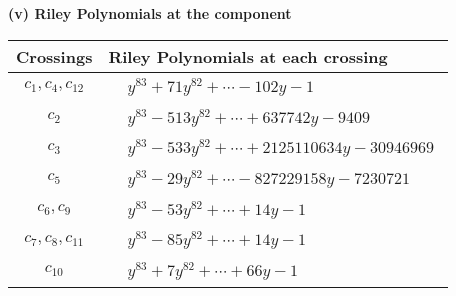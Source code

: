 \documentclass[1p]{elsarticle_modified}
\theoremstyle{definition}
\begin{document}
\flushleft \textbf{(v) Riley Polynomials at the component}\newline \\
\begin{tabular}{m{50pt}|m{274pt}}
Crossings & \hspace{64pt}Riley Polynomials at each crossing \\
\hline $$\begin{aligned}c_{1},c_{4},c_{12}\end{aligned}$$&$\begin{aligned}
&y^{83}+71 y^{82}+\cdots-102 y-1
\end{aligned}$\\
\hline $$\begin{aligned}c_{2}\end{aligned}$$&$\begin{aligned}
&y^{83}-513 y^{82}+\cdots+637742 y-9409
\end{aligned}$\\
\hline $$\begin{aligned}c_{3}\end{aligned}$$&$\begin{aligned}
&y^{83}-533 y^{82}+\cdots+2125110634 y-30946969
\end{aligned}$\\
\hline $$\begin{aligned}c_{5}\end{aligned}$$&$\begin{aligned}
&y^{83}-29 y^{82}+\cdots-827229158 y-7230721
\end{aligned}$\\
\hline $$\begin{aligned}c_{6},c_{9}\end{aligned}$$&$\begin{aligned}
&y^{83}-53 y^{82}+\cdots+14 y-1
\end{aligned}$\\
\hline $$\begin{aligned}c_{7},c_{8},c_{11}\end{aligned}$$&$\begin{aligned}
&y^{83}-85 y^{82}+\cdots+14 y-1
\end{aligned}$\\
\hline $$\begin{aligned}c_{10}\end{aligned}$$&$\begin{aligned}
&y^{83}+7 y^{82}+\cdots+66 y-1
\end{aligned}$\\
\hline
\end{tabular}\\~\\
\end{document}
